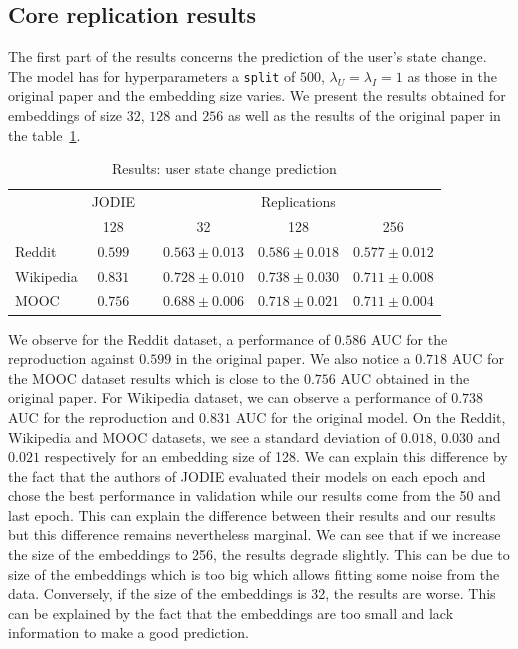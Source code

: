 \subsection*{Core replication results}
The first part of the results concerns the prediction of the user's state change. The model has for hyperparameters a \texttt{split} of $500$, $\lambda_U = \lambda_I = 1$ as those in the original paper and the embedding size varies. We present the results obtained for embeddings of size $32$, $128$ and $256$ as well as the results of the original paper in the table~\ref{result-state}.

\begin{table}[htbp]
    \centering
    \begin{tabular}{@{}lcrrrr@{}}
    \toprule
    & JODIE & \phantom{abc} & \multicolumn{3}{c}{Replications} \\
    \cmidrule{2-2} \cmidrule{4-6}
    & 128 && \multicolumn{1}{c}{32} & \multicolumn{1}{c}{128} & \multicolumn{1}{c}{256} \\
    \midrule
    Reddit & $\boldsymbol{0.599}$ && $0.563 \pm 0.013$ & $0.586 \pm 0.018$ & $0.577 \pm 0.012$\\
    Wikipedia &$\boldsymbol{0.831}$ && $0.728 \pm 0.010$ & $0.738 \pm 0.030$ & $0.711 \pm 0.008$\\
    MOOC &$\boldsymbol{0.756}$ && $0.688 \pm 0.006$ & $0.718 \pm 0.021$ & $0.711 \pm 0.004$\\
    \bottomrule
    \end{tabular}
    \caption{Results: user state change prediction}
    \label{result-state}
\end{table}

We observe for the Reddit dataset, a performance of $0.586$ AUC for the reproduction against $0.599$ in the original paper. We also notice a  $0.718$ AUC  for the MOOC dataset results which is close to the $0.756$ AUC obtained in the original paper. For Wikipedia dataset, we can observe a performance of $0.738$ AUC for the reproduction and $0.831$ AUC for the original model. On the Reddit, Wikipedia and MOOC datasets, we see a standard deviation of $0.018$, $0.030$ and $0.021$ respectively for an embedding size of 128. We can explain this difference by the fact that the authors of JODIE evaluated their models on each epoch and chose the best performance in validation while our results come from the 50 and last epoch. This can explain the difference between their results and our results but this difference remains nevertheless marginal.
We can see that if we increase the size of the embeddings to 256, the results degrade slightly. This can be due to size of the embeddings which is too big which allows fitting some noise from the data. Conversely, if the size of the embeddings is 32, the results are worse. This can be explained by the fact that the embeddings are too small and lack information to make a good prediction.\\

